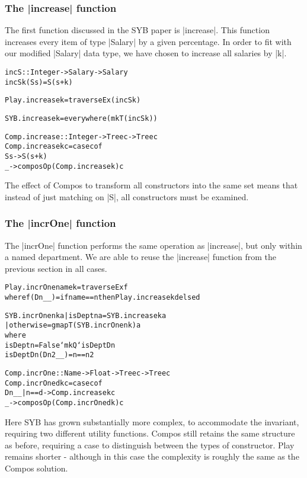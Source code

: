 \documentclass[preprint]{sigplanconf}
\newenvironment{code}{\begin{alltt}\small}{\end{alltt}}
\begin{document}
\subsubsection{The |increase| function}

The first function discussed in the SYB paper is |increase|. This function increases every item of type |Salary| by a given percentage. In order to fit with our modified |Salary| data type, we have chosen to increase all salaries by |k|.

\begin{code}
incS :: Integer -> Salary -> Salary
incS k (S s) = S (s + k)

Play.increase k = traverseEx (incS k)

SYB.increase k = everywhere (mkT (incS k))

Comp.increase :: Integer -> Tree c -> Tree c
Comp.increase k c = case c of
    S s -> S (s + k)
    _ -> composOp (Comp.increase k) c
\end{code}

The effect of Compos to transform all constructors into the same set means that instead of just matching on |S|, all constructors must be examined.

\subsubsection{The |incrOne| function}

The |incrOne| function performs the same operation as |increase|, but only within a named department. We are able to reuse the |increase| function from the previous section in all cases.

\begin{code}
Play.incrOne name k = traverseEx f
    where f (D n _ _) = if name == n then Play.increase k d else d

SYB.incrOne n k a  | isDept n a  = SYB.increase k a
                   | otherwise   = gmapT (SYB.incrOne n k) a
    where
        isDept n = False `mkQ` isDeptD n
        isDeptD n (D n2 _ _) = n==n2

Comp.incrOne :: Name -> Float -> Tree c -> Tree c
Comp.incrOne d k c = case c of
    D n _ _ | n == d -> Comp.increase k c
    _ -> composOp (Comp.incrOne d k) c
\end{code}

Here SYB has grown substantially more complex, to accommodate the invariant, requiring two different utility functions. Compos still retains the same structure as before, requiring a case to distinguish between the types of constructor. Play remains shorter - although in this case the complexity is roughly the same as the Compos solution.
\end{document}
